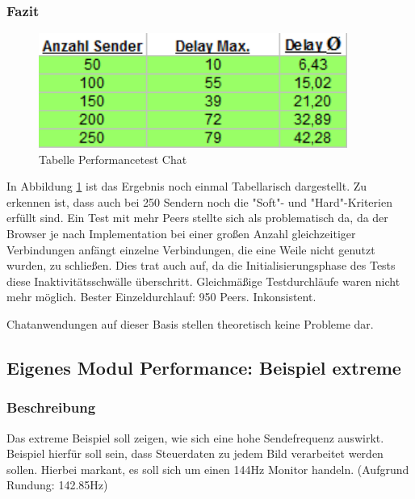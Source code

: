 \subsubsection{Fazit}
\begin{figure}[htH]
\centering
\includegraphics[width=0.9\textwidth]{backend/Tabelle_Performance_Chat.PNG}
\caption{Tabelle Performancetest Chat}
\label{backfig17}
\end{figure}
In Abbildung \ref{backfig17} ist das Ergebnis noch einmal Tabellarisch dargestellt.
Zu erkennen ist, dass auch bei 250 Sendern noch die "Soft"- und "Hard"-Kriterien erfüllt sind.
Ein Test mit mehr Peers stellte sich als problematisch da, da der Browser je nach Implementation bei einer großen Anzahl gleichzeitiger Verbindungen anfängt einzelne Verbindungen, die eine Weile nicht genutzt wurden, zu schließen. Dies trat auch auf, da die Initialisierungsphase des Tests diese Inaktivitätsschwälle überschritt. 
Gleichmäßige Testdurchläufe waren nicht mehr möglich.
Bester Einzeldurchlauf: 950 Peers. Inkonsistent.

Chatanwendungen auf dieser Basis stellen theoretisch keine Probleme dar.



\subsection{Eigenes Modul Performance: Beispiel extreme}
\subsubsection{Beschreibung}
Das extreme Beispiel soll zeigen, wie sich eine hohe Sendefrequenz auswirkt. Beispiel hierfür soll sein, dass Steuerdaten zu jedem Bild verarbeitet werden sollen. Hierbei markant, es soll sich um einen 144Hz Monitor handeln. (Aufgrund Rundung: 142.85Hz)



